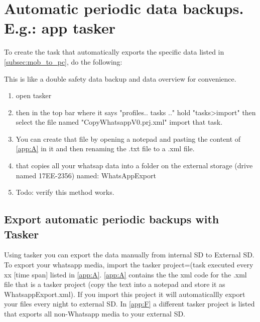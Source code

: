 \section{Automatic periodic data backups. E.g.: app tasker}\label{sec:ch8}
To create the task that automatically exports the specific data listed in \cref{subsec:mob_to_pc}, do the following:

This is like a double safety data backup and data overview for convenience.

\begin{enumerate}
    \item open tasker
    \item then in the top bar where it says "profiles.. tasks .." hold "tasks>import" then select the file named "CopyWhatsappV0.prj.xml" import that task.
    \item You can create that file by opening a notepad and pasting the content of \cref{app:A} in it and then renaming the .txt file to a .xml file.
    \item that copies all your whatsap data into a folder on the external storage (drive named 17EE-2356) named: WhatsAppExport
    \item Todo: verify this method works.
\end{enumerate}


\subsection{Export automatic periodic backups with Tasker}
Using tasker you can export the data manually from internal SD to External SD. To export your whatsapp media, import the tasker project=(task executed every xx [time span] listed in \cref{app:A}. \cref{app:A} contains the the xml code for the .xml file that is a tasker project (copy the text into a notepad and store it as WhatsappExport.xml). If you import this project it will automaticallly export your files every night to external SD. In \cref{app:F} a different tasker project is listed that exports all non-Whatsapp media to your external SD. %
